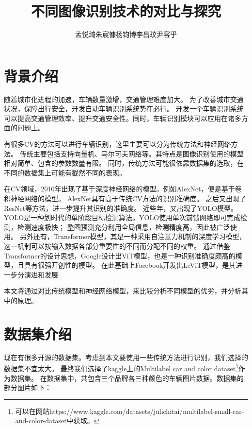 \documentclass[UTF8]{ctexart}
\title{不同图像识别技术的对比与探究}
\author{孟悦琦\quad 朱宸慷\quad 杨钧博\quad 李昌玟\quad 尹容乎}
\begin{document}
\maketitle

\section{背景介绍}
随着城市化进程的加速，车辆数量激增，交通管理难度加大。
为了改善城市交通状况，保障出行安全，开发自动车辆识别系统势在必行。
开发一个车辆识别系统可以提高交通管理效率、提升交通安全性。同时，车辆识别模块可以应用在诸多方面的问题上。 \par

有很多CV的方法可以进行车辆识别，这里主要可以分为传统方法和神经网络方法。
传统主要包括支持向量机、马尔可夫网络等。其特点是图像识别使用的模型相对简单、包含的参数数量有限。
同时，传统方法可能很依靠数据集的选取，在不同的数据集上可能有截然不同的表现。 \par

在CV领域，2010年出现了基于深度神经网络的模型。例如AlexNet，便是基于卷积神经网络的模型。
AlexNet具有高于传统CV方法的识别准确度\cite{AlexNet}。
之后又出现了ResNet\cite{ResNet}等方法，进一步提升其识别的准确度。
近些年，又出现了YOLO模型。
YOLO是一种划时代的单阶段目标检测算法。YOLO使用单次前馈网络即可完成检测，检测速度极快；
整图预测充分利用全局信息，检测精度高，因此被广泛使用\cite{YOLO}。
另外还有，Transformer模型，其是一种采用自注意力机制的深度学习模型，这一机制可以按输入数据各部分重要性的不同而分配不同的权重。
通过借鉴Transformer的设计思想，Google设计出ViT模型，也是一种识别准确度颇高的模型，且具有很强开创性的模型\cite{Vision_Transformers}。
在此基础上Facebook开发出LeViT模型，是其进一步分演进和发展\cite{LeViT} \par

本文将通过对比传统模型和神经网络模型，来比较分析不同模型的优劣，并分析其中的原理。

\section{数据集介绍}
现在有很多开源的数据集。考虑到本文要使用一些传统方法进行识别，我们选择的数据集不宜太大。
最终我们选择了kaggle上的Multilabel car and color dataset\footnote{可以在网站https://www.kaggle.com/datasets/julichitai/multilabel-small-car-and-color-dataset中获取。}作为数据集。
在数据集中，共包含三个品牌各三种颜色的车辆图片数据。数据集的部分图片如下：
\end{document}
